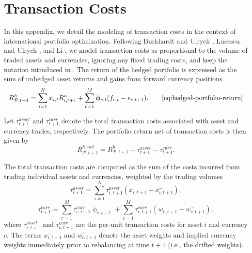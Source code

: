\chapter{Transaction Costs} \label{app:transaction_costs}

In this appendix, we detail the modeling of transaction costs in the context of international portfolio optimization. Following Burkhardt and Ulrych \cite{SparseAndStableInternationalPortfolioOptimization}, Lucescu and Ulrych \cite{RegularizedMultiCurrencyExpectedShortfallPortfolios}, and Li \cite{Li2015}, we model transaction costs as proportional to the volume of traded assets and currencies, ignoring any fixed trading costs, and keep the notation introduced in . The return of the hedged portfolio is expressed as the sum of unhedged asset returns and gains from forward currency positions
\begin{equation}
R^{h}_{\mathcal{P},t+1} = \sum_{i=1}^{N} x_{i,t} R^{u}_{i,t+1} + \sum_{c=1}^{M} \upphi_{c,t} (f_{c,t} - e_{c,t+1}). \tag*{\eqref{eq:hedged-portfolio-return}}
\end{equation}

Let $\tau^{asset}_{t+1}$ and $\tau^{curr}_{t+1}$ denote the total transaction costs associated with asset and currency trades, respectively. The portfolio return net of transaction costs is then given by
\begin{equation}
R^{h,net}_{\mathcal{P},t+1} = R^{h}_{\mathcal{P},t+1} - \tau^{asset}_{t+1} - \tau^{curr}_{t+1}.
\label{eq:hedged-portfolio-return-net}
\end{equation}
 
The total transaction costs are computed as the sum of the costs incurred from trading individual assets and currencies, weighted by the trading volumes
\begin{equation*}
\tau^{asset}_{t+1} = \sum_{i=1}^{N} \tau^{asset}_{i,t+1} \left(x_{i,t+1} - x^{-}_{i,t+1}\right),
\end{equation*}
\begin{equation*}
\tau^{curr}_{t+1} = \sum_{c=1}^{M} \tau^{curr}_{c,t+1}  \upphi_{c,t+1} + \sum_{c=1}^{M} \tau^{curr}_{c,t+1} \left(w_{c,t+1} - w^{-}_{c,t+1}\right),
\end{equation*}
where $\tau^{asset}_{i,t+1}$ and $\tau^{curr}_{c,t+1}$ are the per-unit transaction costs for asset $i$ and currency $c$. The terms $x^{-}_{i,t+1}$ and $w^{-}_{c,t+1}$ denote the asset weights and implied currency weights immediately prior to rebalancing at time $t+1$ (i.e., the drifted weights).

